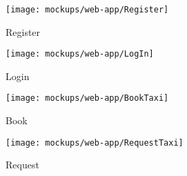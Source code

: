 \newpage
\subsubsection{ }
\vfill
\begin{figure}[h!t]
\caption{Register}
\texttt{[image: mockups/web-app/Register]}
\centering
\end{figure}
\vfill
\clearpage

\newpage
\vfill
\begin{figure}[h!t]
\caption{Login}
\texttt{[image: mockups/web-app/LogIn]}
\centering
\end{figure}
\vfill
\clearpage

\newpage
\vfill
\begin{figure}[h!t]
\caption{Book}
\texttt{[image: mockups/web-app/BookTaxi]}
\centering
\end{figure}
\vfill
\clearpage

\newpage
\vfill
\begin{figure}[h!t]
\caption{Request}
\texttt{[image: mockups/web-app/RequestTaxi]}
\centering
\end{figure}
\vfill
\clearpage



